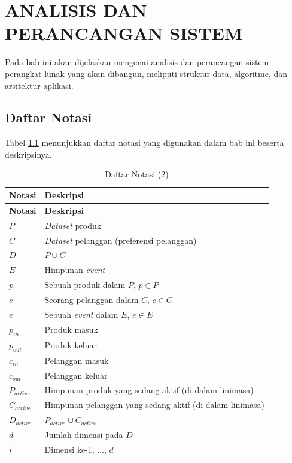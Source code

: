 \chapter{ANALISIS DAN PERANCANGAN SISTEM} \label{chapter:analisis dan perancangan sistem}
\tab Pada bab ini akan dijelaskan mengenai analisis dan perancangan sistem perangkat lunak yang akan dibangun, meliputi struktur data, algoritme, dan arsitektur aplikasi. 

\section{Daftar Notasi}
\tab Tabel \ref{tab:daftar-notasi-2} menunjukkan daftar notasi yang digunakan dalam bab ini beserta deskripsinya.

\begin{longtable}{| p{3cm} | p{6cm} |} 
	\caption{Daftar Notasi (2) \label{tab:daftar-notasi-2}}\\
	\hline
	\textbf{Notasi} & \textbf{Deskripsi}\\ \hline
	\endfirsthead
	\hline
	\textbf{Notasi} & \textbf{Deskripsi}\\ \hline
	\endhead
	$P$ & \textit{Dataset} produk\\ \hline
	$C$ & \textit{Dataset} pelanggan (preferensi pelanggan)\\ \hline
	$D$ & $P \cup C$ \\ \hline
	$E$ & Himpunan \textit{event} \\ \hline
	$p$ & Sebuah produk dalam $P$, $p \in P$\\ \hline
	$c$ & Seorang pelanggan dalam $C$, $c \in C$\\ \hline
	$e$ & Sebuah \textit{event} dalam $E$, $e \in E$ \\ \hline
	$p_{in}$ & Produk masuk \\ \hline
	$p_{out}$ & Produk keluar \\ \hline
	$c_{in}$ & Pelanggan masuk \\ \hline
	$c_{out}$ & Pelanggan keluar \\ \hline
	$P_{active}$ & Himpunan produk yang sedang aktif (di dalam linimasa) \\ \hline	
	$C_{active}$ & Himpunan pelanggan yang sedang aktif (di dalam linimasa) \\ \hline	
	$D_{active}$ & $P_{active} \cup C_{active}$ \\ \hline	
	$d$ & Jumlah dimensi pada $D$\\ \hline
	$i$ & Dimensi ke-1, ..., $d$\\ \hline

\end{longtable}
